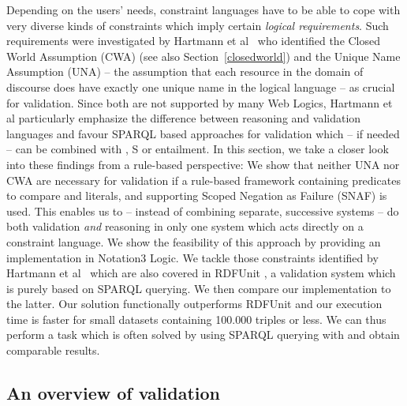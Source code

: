 Depending on the users' needs, constraint languages have to be able to cope with very diverse kinds of constraints which 
imply certain \emph{logical requirements}.
Such requirements were investigated by Hartmann et al~\cite{bosch2015} who
identified the Closed World Assumption (CWA) (see also Section~\ref{closedworld}) and the Unique Name Assumption (UNA) -- the assumption that each resource in the domain of discourse 
does have exactly one unique name in the logical language -- as crucial for validation. Since both are not 
supported by many Web Logics, Hartmann et al
 particularly emphasize
the difference between reasoning and validation languages
and favour SPARQL based approaches for validation
which -- if needed -- can be combined with \rdf, \rdf{}S or \owl entailment.
In this section, we take a closer look into these findings from a rule-based perspective:  
We show that neither UNA nor CWA are necessary for validation if a rule-based framework containing predicates 
to compare \uris and literals, and supporting
Scoped Negation as Failure (SNAF) is used. This enables us to --
instead of combining separate, successive systems --
do both \rdf validation \emph{and} reasoning in only one system which acts directly on a constraint language. 
We show the feasibility of this approach by providing an
implementation in Notation3 Logic.
We tackle those constraints
identified by Hartmann et al~\cite{bosch2015} 
which are also covered in RDFUnit \cite{kontokostas2014test}, a validation system which is purely based on SPARQL querying.
We then compare our implementation to the latter. 
Our solution functionally outperforms RDFUnit and our execution time is 
faster for small datasets containing 100.000 triples or less. We can thus perform a task which is often solved by using SPARQL querying with \nthreelogic and obtain comparable results. 





\subsection{An overview of \rdf validation}\label{rw}

